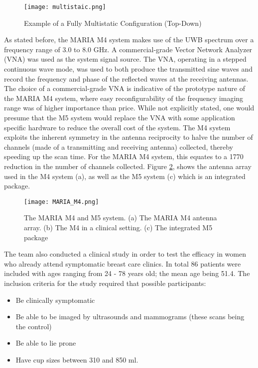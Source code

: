 \begin{figure}
    \texttt{[image: multistaic.png]}
    \centering
    \caption{Example of a Fully Multistatic Configuration (Top-Down)}
    \label{fig:MultistaticExample}
\end{figure}

\noindent As stated before, the MARIA M4 system makes use of the UWB spectrum over a frequency range of 3.0 to 8.0 GHz.
A commercial-grade Vector Network Analyzer (VNA) was used as the system signal source. The VNA, operating in a stepped
continuous wave mode, was used to both produce the transmitted sine waves and record the frequency and phase of the
reflected waves at the receiving antennas. The choice of a commercial-grade VNA is indicative of the prototype nature of
the MARIA M4 system, where easy reconfigurability of the frequency imaging range was of higher importance than price.
While not explicitly stated, one would presume that the M5 system would replace the VNA with some application specific
hardware to reduce the overall cost of the system. The M4 system exploits the inherent symmetry in the antenna
reciprocity to halve the number of channels (made of a transmitting and receiving antenna) collected, thereby speeding
up the scan time. For the MARIA M4 system, this equates to a 1770 reduction in the number of channels collected. Figure
\ref{fig:MARIAM4}, shows the antenna array used in the M4 system (a), as well as the M5 system (c) which is an
integrated package.
\begin{figure}
    \texttt{[image: MARIA\_M4.png]}
    \centering
    \caption{The MARIA M4 and M5 system. (a) The MARIA M4 antenna array. (b) The M4 in a clinical setting. (c) The integrated M5 package \cite{preeceMARIAM4Clinical2016}}
    \label{fig:MARIAM4}
\end{figure}
The team also conducted a clinical study in order to test the efficacy in women who already attend symptomatic
breast care clinics. In total 86 patients were included with ages ranging from 24 - 78 years old; the mean age being
51.4. The inclusion criteria for the study required that possible participants:
\begin{itemize}
    \item Be clinically symptomatic
    \item Be able to be imaged by ultrasounds and mammograms (these scans being the control)
    \item Be able to lie prone
    \item Have cup sizes between 310 and 850 ml.
\end{itemize}
